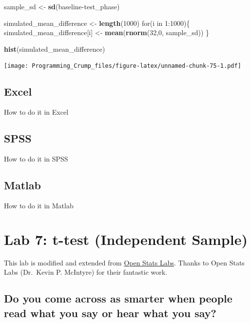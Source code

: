 \documentclass[]{book}
\newenvironment{Shaded}{\begin{snugshade}}{\end{snugshade}}
\newcommand{\KeywordTok}[1]{\textcolor[rgb]{0.13,0.29,0.53}{\textbf{{#1}}}}
\newcommand{\DecValTok}[1]{\textcolor[rgb]{0.00,0.00,0.81}{{#1}}}
\newcommand{\StringTok}[1]{\textcolor[rgb]{0.31,0.60,0.02}{{#1}}}
\newcommand{\NormalTok}[1]{{#1}}
\theoremstyle{definition}
\theoremstyle{definition}
\theoremstyle{definition}
\theoremstyle{remark}
\begin{document}
\begin{Shaded}
\begin{Highlighting}[]
\NormalTok{sample_sd   <-}\StringTok{ }\KeywordTok{sd}\NormalTok{(baseline-test_phase)}

\NormalTok{simulated_mean_difference <-}\StringTok{ }\KeywordTok{length}\NormalTok{(}\DecValTok{1000}\NormalTok{)}
\NormalTok{for(i in }\DecValTok{1}\NormalTok{:}\DecValTok{1000}\NormalTok{)\{}
 \NormalTok{simulated_mean_difference[i] <-}\StringTok{ }\KeywordTok{mean}\NormalTok{(}\KeywordTok{rnorm}\NormalTok{(}\DecValTok{32}\NormalTok{,}\DecValTok{0}\NormalTok{, sample_sd))}
\NormalTok{\}}

\KeywordTok{hist}\NormalTok{(simulated_mean_difference)}
\end{Highlighting}
\end{Shaded}

\texttt{[image: Programming\_Crump\_files/figure-latex/unnamed-chunk-75-1.pdf]}

\section{Excel}\label{excel-5}

How to do it in Excel

\section{SPSS}\label{spss-5}

How to do it in SPSS

\section{Matlab}\label{matlab-5}

How to do it in Matlab

\chapter{Lab 7: t-test (Independent
Sample)}\label{lab-7-t-test-independent-sample}

This lab is modified and extended from
\href{https://sites.trinity.edu/osl}{Open Stats Labs}. Thanks to Open
Stats Labs (Dr.~Kevin P. McIntyre) for their fantastic work.

\section{Do you come across as smarter when people read what you say or
hear what you
say?}\label{do-you-come-across-as-smarter-when-people-read-what-you-say-or-hear-what-you-say}
\end{document}
